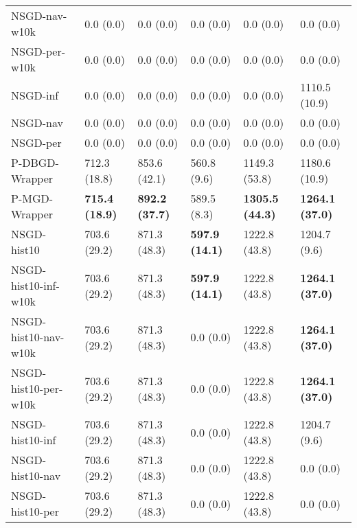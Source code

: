 \begin{tabular*}{\textwidth}{@{\extracolsep{\fill} } l  l l l l l  }
NSGD-nav-w10k & 0.0 {\tiny (0.0)} & 0.0 {\tiny (0.0)} & 0.0 {\tiny (0.0)} & 0.0 {\tiny (0.0)} & 0.0 {\tiny (0.0)} \\
NSGD-per-w10k & 0.0 {\tiny (0.0)} & 0.0 {\tiny (0.0)} & 0.0 {\tiny (0.0)} & 0.0 {\tiny (0.0)} & 0.0 {\tiny (0.0)} \\
NSGD-inf & 0.0 {\tiny (0.0)} & 0.0 {\tiny (0.0)} & 0.0 {\tiny (0.0)} & 0.0 {\tiny (0.0)} & 1110.5 {\tiny (10.9)} \\
NSGD-nav & 0.0 {\tiny (0.0)} & 0.0 {\tiny (0.0)} & 0.0 {\tiny (0.0)} & 0.0 {\tiny (0.0)} & 0.0 {\tiny (0.0)} \\
NSGD-per & 0.0 {\tiny (0.0)} & 0.0 {\tiny (0.0)} & 0.0 {\tiny (0.0)} & 0.0 {\tiny (0.0)} & 0.0 {\tiny (0.0)} \\
P-DBGD-Wrapper & 712.3 {\tiny (18.8)} & 853.6 {\tiny (42.1)} & 560.8 {\tiny (9.6)} & 1149.3 {\tiny (53.8)} & 1180.6 {\tiny (10.9)} \\
P-MGD-Wrapper & \bf 715.4 {\tiny (18.9)} & \bf 892.2 {\tiny (37.7)} & 589.5 {\tiny (8.3)} & \bf 1305.5 {\tiny (44.3)} & \bf 1264.1 {\tiny (37.0)} \\
NSGD-hist10 & 703.6 {\tiny (29.2)} & 871.3 {\tiny (48.3)} & \bf 597.9 {\tiny (14.1)} & 1222.8 {\tiny (43.8)} & 1204.7 {\tiny (9.6)} \\
NSGD-hist10-inf-w10k & 703.6 {\tiny (29.2)} & 871.3 {\tiny (48.3)} & \bf 597.9 {\tiny (14.1)} & 1222.8 {\tiny (43.8)} & \bf 1264.1 {\tiny (37.0)} \\
NSGD-hist10-nav-w10k & 703.6 {\tiny (29.2)} & 871.3 {\tiny (48.3)} & 0.0 {\tiny (0.0)} & 1222.8 {\tiny (43.8)} & \bf 1264.1 {\tiny (37.0)} \\
NSGD-hist10-per-w10k & 703.6 {\tiny (29.2)} & 871.3 {\tiny (48.3)} & 0.0 {\tiny (0.0)} & 1222.8 {\tiny (43.8)} & \bf 1264.1 {\tiny (37.0)} \\
NSGD-hist10-inf & 703.6 {\tiny (29.2)} & 871.3 {\tiny (48.3)} & 0.0 {\tiny (0.0)} & 1222.8 {\tiny (43.8)} & 1204.7 {\tiny (9.6)} \\
NSGD-hist10-nav & 703.6 {\tiny (29.2)} & 871.3 {\tiny (48.3)} & 0.0 {\tiny (0.0)} & 1222.8 {\tiny (43.8)} & 0.0 {\tiny (0.0)} \\
NSGD-hist10-per & 703.6 {\tiny (29.2)} & 871.3 {\tiny (48.3)} & 0.0 {\tiny (0.0)} & 1222.8 {\tiny (43.8)} & 0.0 {\tiny (0.0)} \\
\bottomrule
\end{tabular*}
